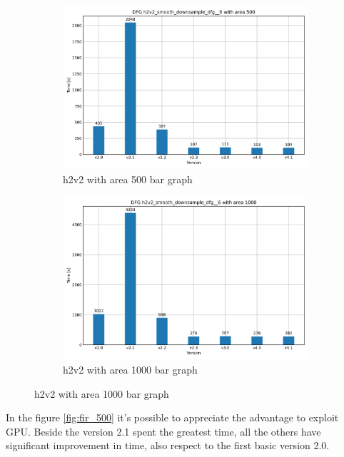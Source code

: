 \begin{figure}[h]
    \centering
    \begin{subfigure}{.45\textwidth}
        \centering
        \includegraphics[width=.95\linewidth]{chapters/figures/h2v2_smooth_downsample_dfg__6_500.png}  
        \caption{h2v2 with area 500 bar graph}
        \label{fig:h2v2_500}
    \end{subfigure}
    \begin{subfigure}{.45\textwidth}
        \centering
        \includegraphics[width=.95\linewidth]{chapters/figures/h2v2_smooth_downsample_dfg__6_1000.png}  
        \caption{h2v2 with area 1000 bar graph}
        \label{fig:h2v2_1000}
    \end{subfigure}
\end{figure}

In the figure \ref{fig:fir_500} it's possible to appreciate the advantage to exploit GPU. Beside the version 2.1 
spent the greatest time, all the others have significant improvement in time, also respect to the first basic version 2.0.

